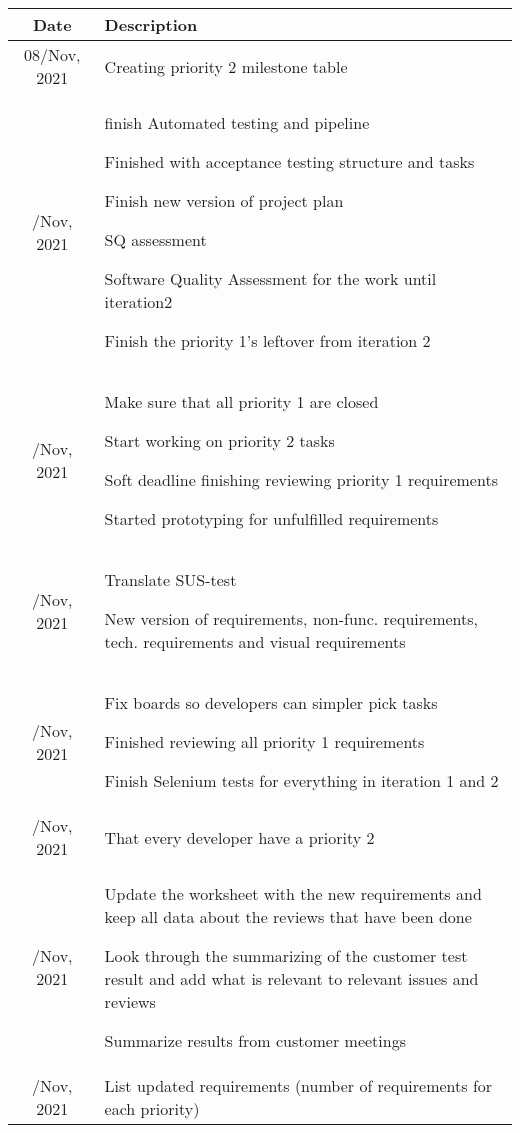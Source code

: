 \begin{table}[H]
\centering
\begin{tabular}{cp{9cm}}
    \toprule
    Date & Description \\
    \midrule
    08/Nov, 2021    & Creating priority 2 milestone table \\
    \addlinespace
    09/Nov, 2021    & finish Automated testing and pipeline
    
    Finished with acceptance testing structure and tasks
    
    Finish new version of project plan
    
    SQ assessment
    
    Software Quality Assessment for  the work until iteration2
    
    Finish the priority 1's leftover from iteration 2 \\
    \addlinespace
    10/Nov, 2021
    & Make sure that all priority 1 are closed
    
    Start working on priority 2 tasks

    Soft deadline finishing reviewing priority 1 requirements

    Started prototyping for unfulfilled requirements  \\
    \addlinespace
    11/Nov, 2021
    & Translate SUS-test

    New version of requirements, non-func. requirements, tech. requirements and visual requirements \\
    \addlinespace
    12/Nov, 2021
    & Fix boards so developers can simpler pick tasks

    Finished reviewing all priority 1 requirements

    Finish Selenium tests for everything in iteration 1 and 2 \\
    \addlinespace
    15/Nov, 2021
    & That every developer have a priority 2 \\
    \addlinespace
    16/Nov, 2021
    & Update the worksheet with the new requirements and keep all data about the reviews that have been done

    Look through the summarizing of the customer test result and add what is relevant to relevant issues and reviews 
    
    Summarize results from customer meetings \\
    \addlinespace
    17/Nov, 2021
    & List updated requirements (number of requirements for each priority)


\end{tabular}
\end{table}
